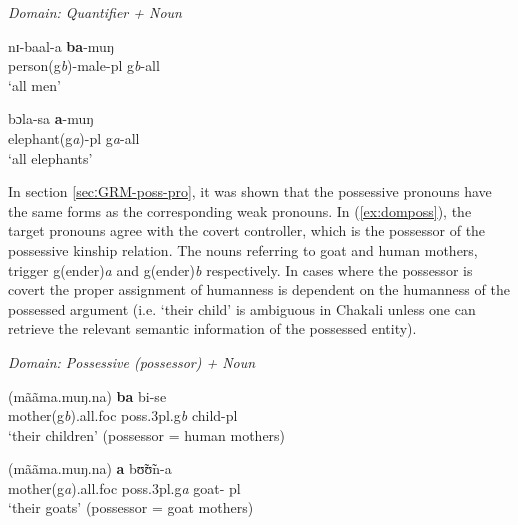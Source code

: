 \begin{exe}
  \ex\label{ex:domquant}{\it Domain: Quantifier + Noun}\\
\begin{xlist}

\ex\label{ex:domquantH+}

\gll   nɪ-baal-a     \textbf{ba}-muŋ \\
       {person({\sc g}{\it b})-male-{\sc pl}} {\sc g}{\it b}-{\sc all} \\
\glt `all men' \\

\ex\label{ex:domquantH-}

\gll   bɔla-sa  \textbf{a}-muŋ\\
        {elephant({\sc g}{\it a})-{\sc pl}}  {\sc g}{\it a}-{\sc all}\\
\glt `all elephants' \\

\end{xlist}
\end{exe}

In section \ref{secːGRM-poss-pro}, it was shown   that the possessive pronouns
have the same forms as
the corresponding weak
pronouns.  In
(\ref{ex:domposs}),  the target pronouns agree with the covert
controller, which is the possessor of the possessive kinship relation.
The nouns referring to goat and human mothers, trigger
{\sc g(ender)}{\it a} and {\sc g(ender)}{\it b}
respectively. In cases where the possessor is covert the proper
assignment of humanness is dependent on the humanness of the possessed
argument (i.e. `their child' is ambiguous in Chakali unless one can 
retrieve the relevant semantic  information of the possessed entity).

\begin{exe}
  \ex\label{ex:domposs}{\it Domain: Possessive (possessor) + Noun}\\
\begin{xlist}

\ex\label{ex:dompossH+}

\gll (mããma.muŋ.na)   \textbf{ba}   bi-se\\
       mother({\sc g}{\it b}).all.{\sc foc}  {\sc poss.3pl.g}{\it b}
{child-{\sc pl}} \\
\glt `their children' (possessor = human mothers) 

\ex\label{ex:dompossH-}

\gll (mããma.muŋ.na)   \textbf{a}   bʊ̃ʊ̃n-a   \\
      mother({\sc g}{\it a}).all.{\sc foc}  {\sc poss.3pl.g}{\it a} {goat-{\sc
pl}} \\
\glt `their goats' (possessor = goat mothers) 




\end{xlist}
\end{exe}
 

